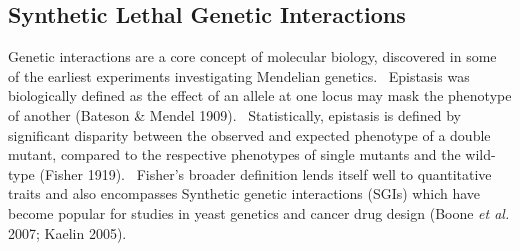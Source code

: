 


\subsection{Synthetic Lethal Genetic Interactions}
Genetic interactions are a core concept of molecular biology, discovered in some of the earliest experiments investigating Mendelian genetics. \ Epistasis was biologically defined as the effect of an allele at one locus may mask the phenotype of another (Bateson \& Mendel 1909). \ Statistically, epistasis is defined by significant disparity between the observed and expected phenotype of a double mutant, compared to the respective phenotypes of single mutants and the wild-type (Fisher 1919). \ Fisher{\textquoteright}s broader definition lends itself well to quantitative traits and also encompasses Synthetic genetic interactions (SGIs) which have become popular for studies in yeast genetics and cancer drug design (Boone\textit{ et al.} 2007; Kaelin 2005). \ 


